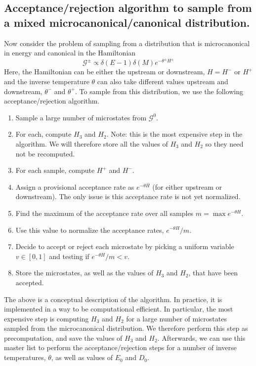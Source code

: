 \documentclass[12pt]{article}
\newcommand{\Gibbs}{\mathcal{G}}
\begin{document}
\subsection{Acceptance/rejection algorithm to sample from a mixed microcanonical/canonical distribution.}
\label{sec_accrej}

Now consider the problem of sampling from a distribution that is microcanonical in energy and canonical in the Hamiltonian
\begin{equation}
\Gibbs^{\pm} \propto \delta(E-1) \delta(M) e^{-\theta^{\pm} H^{\pm}}
\end{equation}
Here, the Hamiltonian can be either the upstream or downstream, $H = H^-$ or $H^+$ and the inverse temperature $\theta$ can also take different values upstream and downstream, $\theta^-$ and $\theta^+$. To sample from this distribution, we use the following acceptance/rejection algorithm.
\begin{enumerate}
\item Sample a large number of microstates from $\Gibbs^0$.
\item For each, compute $H_3$ and $H_2$. Note: this is the most expensive step in the algorithm. We will therefore store all the values of $H_3$ and $H_2$ so they need not be recomputed.
\item For each sample, compute $H^+$ and $H^-$.
\item Assign a provisional acceptance rate as $e^{- \theta H}$ (for either upstream or downstream). The only issue is this acceptance rate is not yet normalized.
\item Find the maximum of the acceptance rate over all samples $m = \max{e^{-\theta H}}$.
\item Use this value to normalize the acceptance rates, $e^{- \theta H}/m$.
\item Decide to accept or reject each microstate by picking a uniform variable $v \in [0,1]$ and testing if $e^{- \theta H}/m < v$.
\item Store the microstates, as well as the values of $H_3$ and $H_2$, that have been accepted.
\end{enumerate}
The above is a conceptual description of the algorithm. In practice, it is implemented in a way to be computational efficient. In particular, the most expensive step is computing $H_3$ and $H_2$ for a large number of microstates sampled from the microcanonical distribution. We therefore perform this step as precomputation, and save the values of $H_3$ and $H_2$. Afterwards, we can use this master list to perform the acceptance/rejection steps for a number of inverse temperatures, $\theta$, as well as values of $E_0$ and $D_0$.
\end{document}
